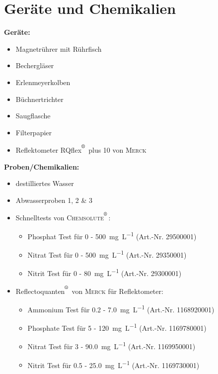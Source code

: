 \section{Geräte und Chemikalien}
\label{sec:geraete}

\textbf{Geräte:}
\begin{itemize}
	\item Magnetrührer mit Rührfisch
	\item Bechergläser
	\item Erlenmeyerkolben
	\item Büchnertrichter
	\item Saugflasche
	\item Filterpapier
	\item Reflektometer RQflex$^{\textsuperscript{\textregistered}}$ plus 10 von \textsc{Merck}
\end{itemize}

\vspace*{5mm}

\textbf{Proben/Chemikalien:}
\begin{itemize}
	\item destilliertes Wasser
	\item Abwasserproben 1, 2 \& 3
		\item Schnelltests von \textsc{Chemsolute$^{\textsuperscript{\textregistered}}$}:
	\begin{itemize}
		\item Phosphat Test für \SI{0}{} - \SI{500}{\milli \gram \per \liter}  (Art.-Nr. 29500001) 
		\item Nitrat Test für \SI{0}{} - \SI{500}{\milli \gram \per \liter}  (Art.-Nr. 29350001) 
		\item Nitrit Test für \SI{0}{} - \SI{80}{\milli \gram \per \liter}  (Art.-Nr. 29300001) 
	\end{itemize}
	\item Reflectoquanten$^{\textsuperscript{\textregistered}}$ von \textsc{Merck} für Reflektometer:
	\begin{itemize}
		\item Ammonium Test für \SI{0.2}{} - \SI{7.0}{\milli \gram \per \liter}  (Art.-Nr. 1168920001) 
		\item Phosphate Test für \SI{5}{} - \SI{120}{\milli \gram \per \liter}  (Art.-Nr. 1169780001) 
		\item Nitrat Test für \SI{3}{} - \SI{90.0}{\milli \gram \per \liter}  (Art.-Nr. 1169950001) 
		\item Nitrit Test für \SI{0.5}{} - \SI{25.0}{\milli \gram \per \liter}  (Art.-Nr. 1169730001) 
	\end{itemize}
\end{itemize}





